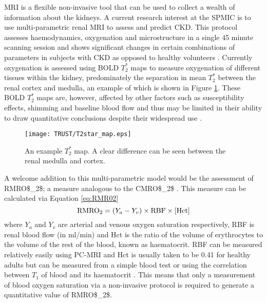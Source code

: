 \ac{MRI} is a flexible non-invasive tool that can be used to collect a wealth of information about the kidneys. A current research interest at the \ac{SPMIC} is to use multi-parametric renal \ac{MRI} to assess and predict \ac{CKD}. This protocol assesses haemodynamics, oxygenation and microstructure in a single 45 minute scanning session and shows significant changes in certain combinations of parameters in subjects with \ac{CKD} as opposed to healthy volunteers \cite{cox_multiparametric_2017}. Currently oxygenation is assessed using \ac{BOLD} $T_2^*$ maps to measure oxygenation of different tissues within the kidney, predominately the separation in mean $T_2^*$ between the renal cortex and medulla, an example of which is shown in Figure \ref{fig:T2*map}. These \ac{BOLD} $T_2^*$ maps are, however, affected by other factors such as susceptibility effects, shimming and baseline blood flow and thus may be limited in their ability to draw quantitative conclusions despite their widespread use \cite{pruijm_blood_2017, niendorf_how_nodate}. 
\begin{figure}[H]
	\centering
	\texttt{[image: TRUST/T2star\_map.eps]}
	\caption{An example $T_2^*$ map. A clear difference can be seen between the renal medulla and cortex.}
	\label{fig:T2*map}	
\end{figure}

A welcome addition to this multi-parametric model would be the assessment of \ac{RMRO$_2$}; a measure analogous to the \ac{CMRO$_2$} \cite{chong_cerebral_2015}. This measure can be calculated via Equation \eqref{eq:RMR02}
\begin{equation}
\textup{RMRO}_{\textup{2}} = \left( Y_a - Y_v \right) \times \textup{RBF} \times \left[\textup{Hct}\right]
\label{eq:RMR02}
\end{equation}
where $Y_a$ and $Y_v$ are arterial and venous oxygen saturation respectively, RBF is renal blood flow (in ml/min) and Hct is the ratio of the volume of erythrocytes to the volume of the rest of the blood, known as haematocrit. \ac{RBF} can be measured relatively easily using \ac{PC}-\ac{MRI} \cite{jordan_velocity_1994} and Hct is usually taken to be 0.41 for healthy adults but can be measured from a simple blood test \cite{miao_reference_2002, gardener_dependence_2010} or using the correlation between $T_1$ of blood and its haematocrit \cite{shimada_vivo_2012}. This means that only a measurement of blood oxygen saturation via a non-invasive protocol is required to generate a quantitative value of \ac{RMRO$_2$}.\\

